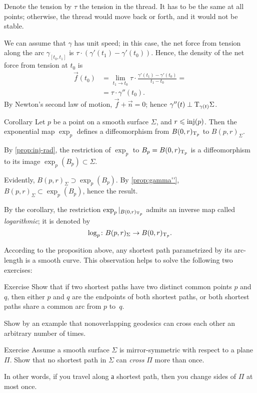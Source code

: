 Denote the tension by $\tau$ the tension in the thread.
It has to be the same at all points;
otherwise, the thread would move back or forth, and it would not be stable.


We can assume that $\gamma$ has unit speed;
in this case, the net force from tension along the arc $\gamma_{[t_0,t_1]}$ is $\tau\cdot(\gamma'(t_1)-\gamma'(t_0))$.
Hence, the density of the net force from tension at $t_0$ is 
\begin{align*}
\vec f(t_0)&=\lim_{t_1\to t_0}\tau\cdot\frac{\gamma'(t_1)-\gamma'(t_0)}{t_1-t_0}=
\\
&=\tau\cdot\gamma''(t_0).
\end{align*}
By Newton's second law of motion,  
$\vec f+\vec n=0$; hence $\gamma''(t)\perp\mathrm{T}_{\gamma(t)}\Sigma$.
\qeds

\begin{thm}{Corollary}
Let $p$ be a point on a smooth surface $\Sigma$, and $r\z\le \inj(p)$.
Then the exponential map $\exp_p$ defines a diffeomorphism from $B(0,r)_{\mathrm{T}_p}$ to $B(p,r)_\Sigma$.
\end{thm}

By \ref{prop:inj-rad}, the restriction of $\exp_p$ to $B_p={B(0,r)_{\mathrm{T}_p}}$ is a diffeomorphism to its image $\exp_p(B_p)\subset \Sigma$.

Evidently, $B(p,r)_\Sigma\supset\exp_p(B_p)$.
By \ref{prop:gamma''}, $B(p,r)_\Sigma\subset\exp_p(B_p)$, hence the result.
\qeds

By the corollary, the restriction $\exp_p|_{B(0,r)_{\mathrm{T}_p}}$ admits an inverse map called \emph{logarithmic};
it is denoted by \[\log_p\colon B(p,r)_\Sigma\to B(0,r)_{\mathrm{T}_p}.\]

According to the proposition above, any shortest path parametrized by its arc-length is a smooth curve.
This observation helps to solve the following two exercises:

\begin{thm}{Exercise}\label{ex:two-min-geod}
Show that if two shortest paths have two distinct common points $p$ and $q$, then either $p$ and $q$ are the endpoints of both shortest paths, or both shortest paths share a common arc from $p$ to~$q$.

Show by an example that nonoverlapping geodesics can cross each other an arbitrary number of times.
\end{thm}

\begin{thm}{Exercise}\label{ex:min-geod+plane}
Assume a smooth surface $\Sigma$ is mirror-symmetric with respect to a plane $\Pi$.
Show that no shortest path in $\Sigma$ can {}\emph{cross} $\Pi$ more than once.

In other words, if you travel along а shortest path, then you change sides of $\Pi$ at most once. 
\end{thm}

